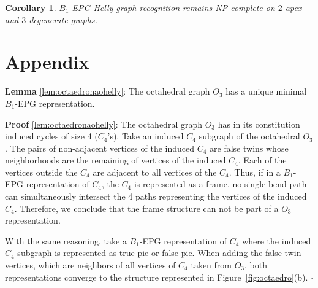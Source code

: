 \documentclass[9pt]{entcs}
\newtheorem{coro}{Corollary}[section]
\newtheorem{prove}{Proof}[section]
\begin{document}
\begin{coro}\label{coro:2apexAnd3degenerate}
{\sc $B_{1}$-EPG-Helly graph recognition} remains NP-complete on $2$-apex and $3$-degenerate graphs.
\end{coro}







\cleardoublepage
\newpage

\section{Appendix}

\begin{lema*}\hspace{0.5cm}\textbf{Lemma} \ref{lem:octaedronaohelly}:
The octahedral graph $O_3$ has a unique minimal  $ B_1$-EPG representation.%
\end{lema*}

\begin{prove*}\textbf{Proof} \ref{lem:octaedronaohelly}:
The octahedral graph $ O_3 $ has in its constitution induced cycles of size 4 ($ C_4$'s). 
Take an induced $ C_4 $ subgraph  of the octahedral $ O_3 $. The pairs of non-adjacent vertices of the induced $C_4$ are false twins whose neighborhoods are the remaining of vertices of the induced $C_4$. Each of the vertices outside the $C_4$ are adjacent to all vertices of the $C_4$. Thus, if in a $ B_1$-EPG representation of $C_4$, the $ C_4 $ is represented as a frame, no single bend path can simultaneously intersect the 4 paths representing the vertices of the induced $ C_4 $. Therefore, we conclude that the frame structure can not be part of a $ O_3 $ representation.

With the same reasoning, take a $ B_1$-EPG representation of $C_4$ where the induced $ C_4 $ subgraph is represented as true pie or false pie. When adding the false twin vertices, which are neighbors of all vertices of $ C_4 $ taken from $ O_3 $, both representations converge to the structure represented in Figure~\ref{fig:octaedro}(b). 
$\square$ \end{prove*}
\end{document}
